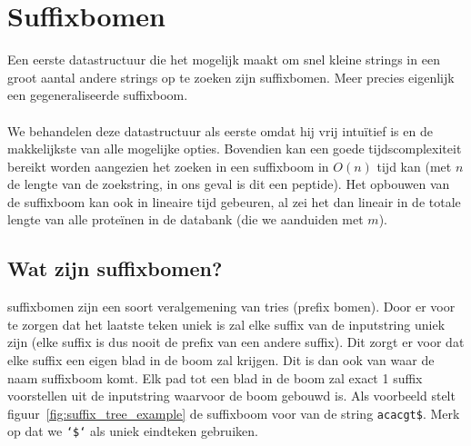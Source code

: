 \chapter{Suffixbomen}\label{ch:suffix-bomen}
Een eerste datastructuur die het mogelijk maakt om snel kleine strings in een groot aantal andere strings op te zoeken zijn suffixbomen.
Meer precies eigenlijk een gegeneraliseerde suffixboom.
\\ \\
We behandelen deze datastructuur als eerste omdat hij vrij intuïtief is en de makkelijkste van alle mogelijke opties.
Bovendien kan een goede tijdscomplexiteit bereikt worden aangezien het zoeken in een suffixboom in $O(n)$ tijd kan (met $n$ de lengte van de zoekstring, in ons geval is dit een peptide).
Het opbouwen van de suffixboom kan ook in lineaire tijd gebeuren, al zei het dan lineair in de totale lengte van alle proteïnen in de databank (die we aanduiden met $m$).

\section{Wat zijn suffixbomen?}\label{sec:wat-zijn-suffix-bomen?}
suffixbomen zijn een soort veralgemening van tries (prefix bomen).
Door er voor te zorgen dat het laatste teken uniek is zal elke suffix van de inputstring uniek zijn (elke suffix is dus nooit de prefix van een andere suffix).
Dit zorgt er voor dat elke suffix een eigen blad in de boom zal krijgen.
Dit is dan ook van waar de naam suffixboom komt.
Elk pad tot een blad in de boom zal exact 1 suffix voorstellen uit de inputstring waarvoor de boom gebouwd is.
Als voorbeeld stelt figuur~\ref{fig:suffix_tree_example} de suffixboom voor van de string \texttt{acacgt\$}.
Merk op dat we \texttt{`\$`} als uniek eindteken gebruiken.

